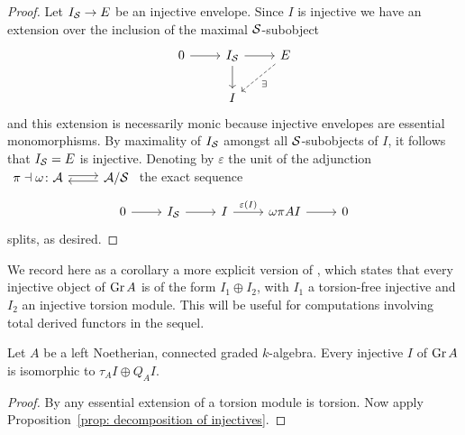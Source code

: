 \begin{proof}
  Let \(I_{\mathcal{S}} \to E\) be an injective envelope.
  Since \(I\) is injective we have an extension over the inclusion of the maximal \(\mathcal{S}\)-subobject
  \[\begin{tikzcd}
  0 \arrow{r} & I_\Serre \arrow{r}\arrow{d} & E \arrow[dashed]{ld}{\exists}\\
  & I
  \end{tikzcd}\]
  and this extension is necessarily monic because injective envelopes are essential monomorphisms.
  By maximality of \(I_{\mathcal{S}}\) amongst all \(\mathcal{S}\)-subobjects of \(I\), it follows that \(I_{\mathcal{S}} = E\) is injective.
  Denoting by \(\varepsilon\) the unit of the adjunction
  \(\begin{tikzcd}
  \pi \dashv \omega \colon \A \arrow[shift left=.5ex]{r} & \A/\Serre \arrow[shift left=.5ex]{l}
  \end{tikzcd}\)
  the exact sequence
  \[\begin{tikzcd}
  0 \arrow{r} & I_\Serre \arrow{r} & I \arrow{r}{\varepsilon(I)} & \omega\pi{A} I \arrow{r} & 0
  \end{tikzcd}\]  splits, as desired.
\end{proof}
We record here as a corollary a more explicit version of \textcite[Prop 7.1 (5)]{AZ94}, which states that every injective object of \(\operatorname{Gr}A\) is of the form \(I_1 \oplus I_2\), with \(I_1\) a torsion-free injective and \(I_2\) an injective torsion module.
This will be useful for computations involving total derived functors in the sequel.

\begin{corollary} \label{cor: Gr injectives}
  Let \(A\) be a left Noetherian, connected graded \(k\)-algebra.
  Every injective \(I\) of \(\operatorname{Gr}A\) is isomorphic to \(\tau_A I \oplus Q_A I\).

\end{corollary}

\begin{proof}
  By \textcite[Prop 2.2]{AZ94} any essential extension of a torsion module is torsion.
  Now apply Proposition~\ref{prop: decomposition of injectives}.
\end{proof}
